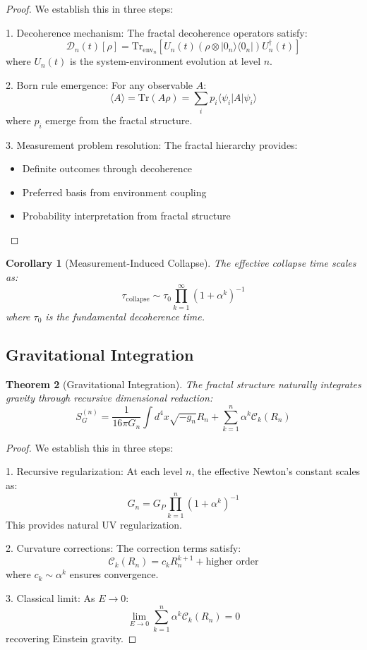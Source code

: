\documentclass[12pt]{article}
\newtheorem{theorem}{Theorem}[section]
\newtheorem{corollary}[theorem]{Corollary}
\begin{document}
\begin{proof}
We establish this in three steps:

1. Decoherence mechanism:
   The fractal decoherence operators satisfy:
   \[
   \mathcal{D}_n(t)[\rho] = \text{Tr}_{\text{env}_n}\left[U_n(t)(\rho \otimes |0_n\rangle\langle 0_n|)U_n^\dagger(t)\right]
   \]
   where $U_n(t)$ is the system-environment evolution at level $n$.

2. Born rule emergence:
   For any observable $A$:
   \[
   \langle A \rangle = \text{Tr}(A\rho) = \sum_i p_i \langle \psi_i|A|\psi_i\rangle
   \]
   where $p_i$ emerge from the fractal structure.

3. Measurement problem resolution:
   The fractal hierarchy provides:
   \begin{itemize}
   \item Definite outcomes through decoherence
   \item Preferred basis from environment coupling
   \item Probability interpretation from fractal structure
   \end{itemize}
\end{proof}

\begin{corollary}[Measurement-Induced Collapse]
The effective collapse time scales as:
\[
\tau_{\text{collapse}} \sim \tau_0 \prod_{k=1}^{\infty} (1 + \alpha^k)^{-1}
\]
where $\tau_0$ is the fundamental decoherence time.
\end{corollary}

\subsection{Gravitational Integration}

\begin{theorem}[Gravitational Integration]
The fractal structure naturally integrates gravity through recursive dimensional reduction:
\[
S_G^{(n)} = \frac{1}{16\pi G_n} \int d^4x \sqrt{-g_n} R_n + \sum_{k=1}^n \alpha^k \mathcal{C}_k(R_n)
\]
\end{theorem}

\begin{proof}
We establish this in three steps:

1. Recursive regularization:
   At each level $n$, the effective Newton's constant scales as:
   \[
   G_n = G_P \prod_{k=1}^n (1 + \alpha^k)^{-1}
   \]
   This provides natural UV regularization.

2. Curvature corrections:
   The correction terms satisfy:
   \[
   \mathcal{C}_k(R_n) = c_k R_n^{k+1} + \text{higher order}
   \]
   where $c_k \sim \alpha^k$ ensures convergence.

3. Classical limit:
   As $E \to 0$:
   \[
   \lim_{E \to 0} \sum_{k=1}^n \alpha^k \mathcal{C}_k(R_n) = 0
   \]
   recovering Einstein gravity.
\end{proof}
\end{document}
